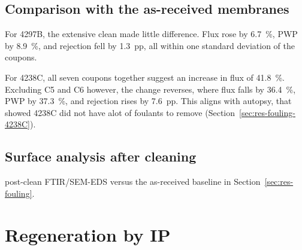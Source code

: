 \subsection{Comparison with the as-received membranes}
 \label{sec:res-cleaning-compare}
For 4297B, the extensive clean made little difference. Flux rose by \qty{6.7}{\percent}, PWP by \qty{8.9}{\percent}, and rejection fell by \qty{1.3}{pp}, all within one standard deviation of the coupons. 

For 4238C, all seven coupons together suggest an increase in flux of \qty{41.8}{\percent}. Excluding C5 and C6 however, the change reverses, where flux falls by \qty{36.4}{\percent}, PWP by \qty{37.3}{\percent}, and rejection rises by \qty{7.6}{pp}. This aligns with autopsy, that showed 4238C did not have alot of foulants to remove (Section~\ref{sec:res-fouling-4238C}). 




\subsection{Surface analysis after cleaning}
\label{sec:res-cleaning-surface}
post-clean FTIR/SEM-EDS versus the as-received baseline in Section~\ref{sec:res-fouling}.




\section{Regeneration by IP}
\label{sec:res-ip}


